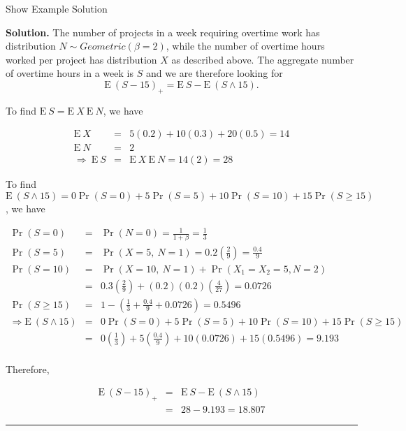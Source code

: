 \documentclass[]{book}
\theoremstyle{definition}
\theoremstyle{definition}
\theoremstyle{definition}
\theoremstyle{remark}
\begin{document}
Show Example Solution

\hypertarget{toggleExampleAggLoss.3.6}{}
\textbf{Solution.} The number of projects in a week requiring overtime
work has distribution \(N \sim Geometric(\beta=2)\), while the number of
overtime hours worked per project has distribution \(X\) as described
above. The aggregate number of overtime hours in a week is \(S\) and we
are therefore looking for
\[\mathrm{E~}(S-15)_+ = \mathrm{E~}S - \mathrm{E~}(S \wedge 15).\]

To find \(\mathrm{E~}S = \mathrm{E~}X \ \mathrm{E~}N\), we have

\begin{eqnarray*}
\mathrm{E~}X &=& 5(0.2) + 10(0.3)+ 20(0.5)= 14 \\
\mathrm{E~}N &=& 2 \\
\Rightarrow \ \mathrm{E~}S &=& \mathrm{E~}X \ \mathrm{E~}N = 14(2) = 28
\end{eqnarray*}

To find
\(\mathrm{E~} (S \wedge 15) = 0 \Pr (S=0) + 5 \Pr(S=5) + 10 \Pr(S=10) + 15 \Pr(S \geq 15)\),
we have

\begin{eqnarray*}
\Pr(S=0) &=& \Pr(N=0) = \frac{1}{1+\beta} = \frac{1}{3} \\
\Pr(S=5) &=& \Pr(X=5, \ N=1) = 0.2 \left(\frac{2}{9} \right)= \frac{0.4}{9}\\
\Pr(S=10) &=& \Pr(X=10, \ N=1) + \Pr(X_1=X_2=5, N=2) \\
&=& 0.3 \left(\frac{2}{9} \right) + (0.2)(0.2) \left( \frac{4}{27} \right)= 0.0726 \\
\Pr(S \geq 15) &=& 1 - \left(\frac{1}{3} + \frac{0.4}{9} + 0.0726 \right) = 0.5496\\
\Rightarrow \mathrm{E~}(S \wedge 15) &=& 0 \Pr (S=0) + 5 \Pr(S=5) + 10 \Pr(S=10) + 15 \Pr(S \geq 15) \\
&=& 0 \left( \frac{1}{3} \right) + 5
\left( \frac{0.4}{9} \right) + 10 (0.0726) + 15 (0.5496) = 9.193\\
\end{eqnarray*}

Therefore,

\begin{eqnarray*}
\mathrm{E~}(S-15)_+ &=& \mathrm{E~}S - \mathrm{E~}(S \wedge 15) \\
&=& 28 - 9.193 = 18.807
\end{eqnarray*}

\begin{center}\rule{0.5\linewidth}{\linethickness}\end{center}
\end{document}

